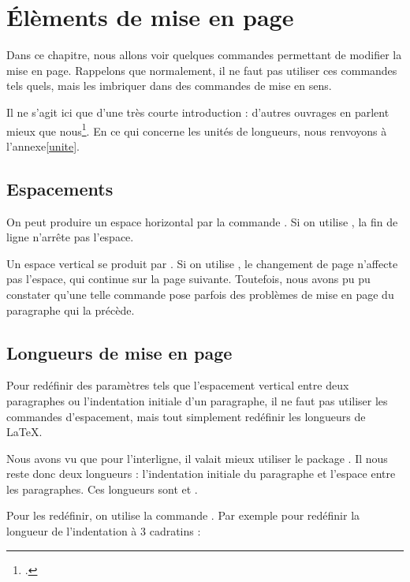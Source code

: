 \chapter{Élèments de mise en page}\label{espacement}

\begin{prealable}
Dans ce chapitre, nous allons voir quelques commandes permettant de modifier la mise en page.
Rappelons que normalement, il ne faut pas utiliser ces commandes tels quels, mais les imbriquer dans des commandes de mise en sens.

Il ne s'agit ici que d'une très courte introduction : d'autres ouvrages en parlent mieux que nous\footcites(En particulier)(){frama}{latex_graphic_companion}.
En ce qui concerne les unités de longueurs, nous renvoyons à l'annexe\ref{unite}.
\end{prealable}

\section{Espacements}\label{espace}

On peut produire un espace horizontal par la commande . Si on utilise , la fin de ligne n'arrête pas l'espace.

Un espace vertical se produit par . Si on utilise , le changement de page n'affecte pas  l'espace, qui continue sur la page suivante. Toutefois, nous avons pu pu constater qu'une telle commande pose parfois des problèmes de mise en page du paragraphe qui la précède.



\section{Longueurs de mise en page}

Pour redéfinir des paramètres tels que l'espacement vertical entre deux paragraphes ou l'indentation initiale d'un paragraphe, il ne faut pas utiliser les commandes d'espacement, mais tout simplement redéfinir les longueurs de \LaTeX. 

Nous avons vu que pour l'interligne, il valait mieux utiliser le package . Il nous reste donc deux longueurs : l'indentation initiale du paragraphe et l'espace entre les paragraphes. Ces longueurs sont  et .

Pour les redéfinir, on utilise la commande . Par exemple pour redéfinir la longueur de l'indentation à 3 cadratins :\label{setlength}

